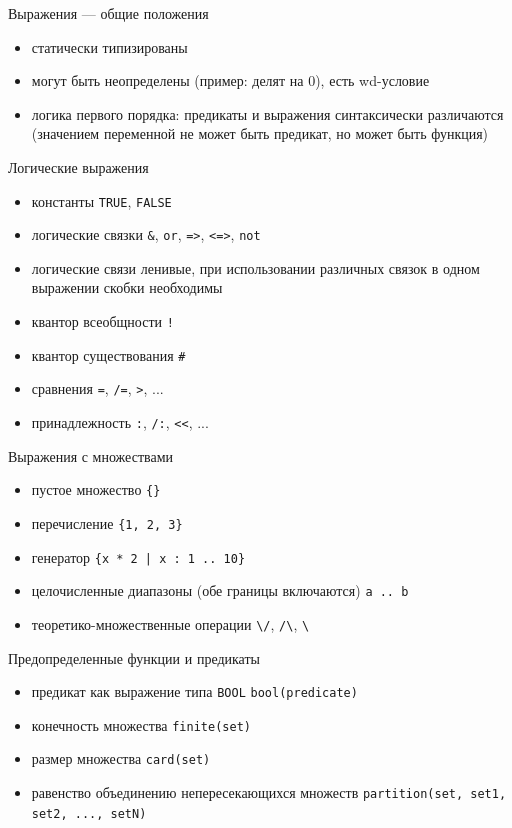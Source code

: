 \documentclass[hyperref={unicode=true}]{beamer}
\begin{document}
	\begin{frame}{Выражения --- общие положения}
		\begin{itemize}
			\item статически типизированы
			\item могут быть неопределены (пример: делят на 0),
			      есть wd-условие
			\item логика первого порядка: предикаты
			      и выражения синтаксически различаются
				  (значением переменной не может быть предикат,
				   но может быть функция)
		\end{itemize}
	\end{frame}

	\begin{frame}[fragile]{Логические выражения}
		\begin{itemize}
			\item константы \verb|TRUE|, \verb|FALSE|
			\item логические связки \verb|&|, \verb|or|,
			      \verb|=>|, \verb|<=>|, \verb|not|
			\item логические связи ленивые, при использовании
			      различных связок в одном выражении
			      скобки необходимы
			\item квантор всеобщности \verb|!|
			\item квантор существования \verb|#|
			\item сравнения \verb|=|, \verb|/=|, \verb|>|, ...
			\item принадлежность \verb|:|, \verb|/:|, \verb|<<|, ...
		\end{itemize}
	\end{frame}

	\begin{frame}[fragile]{Выражения с множествами}
		\begin{itemize}
			\item пустое множество \verb|{}|
			\item перечисление \verb|{1, 2, 3}|
			\item генератор \verb`{x * 2 | x : 1 .. 10}`
			\item целочисленные диапазоны (обе границы включаются) \verb|a .. b|
			\item теоретико-множественные операции \verb|\/|, \verb|/\|, \verb|\|
		\end{itemize}
	\end{frame}

	\begin{frame}[fragile]{Предопределенные функции и предикаты}
		\begin{itemize}
			\item предикат как выражение типа \texttt{BOOL} \verb|bool(predicate)|
			\item конечность множества \verb|finite(set)|
			\item размер множества \verb|card(set)|
			\item равенство объединению непересекающихся множеств
			      \verb|partition(set, set1, set2, ..., setN)|
		\end{itemize}
	\end{frame}
\end{document}
